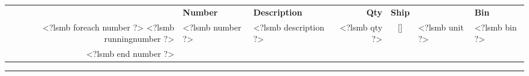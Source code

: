 \documentclass{scrartcl}
\begin{document}
\begin{tabularx}{\textwidth}{@{}rlXrcll@{}}
\vspace{1cm}

\begin{tabularx}{\textwidth}{@{}rlXrcll@{}}
  \textbf{Item} & \textbf{Number} & \textbf{Description} &
  \textbf{Qty} & \textbf{Ship} & & \textbf{Bin} \\
<?lsmb foreach number ?>
  <?lsmb runningnumber ?> & <?lsmb number ?> & <?lsmb description ?> &
  <?lsmb qty ?> & [\hspace{1cm}] & <?lsmb unit ?> & <?lsmb bin ?> \\
<?lsmb end number ?>
\end{tabularx}


\parbox{\textwidth}{
\rule{\textwidth}{2pt}
}
\end{document}
